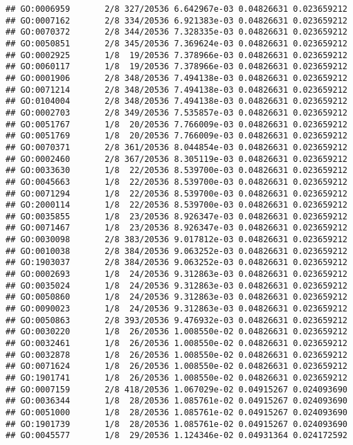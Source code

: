 \documentclass[
]{article}
\begin{document}
\begin{verbatim}
## GO:0006959       2/8 327/20536 6.642967e-03 0.04826631 0.023659212
## GO:0007162       2/8 334/20536 6.921383e-03 0.04826631 0.023659212
## GO:0070372       2/8 344/20536 7.328335e-03 0.04826631 0.023659212
## GO:0050851       2/8 345/20536 7.369624e-03 0.04826631 0.023659212
## GO:0002925       1/8  19/20536 7.378966e-03 0.04826631 0.023659212
## GO:0060117       1/8  19/20536 7.378966e-03 0.04826631 0.023659212
## GO:0001906       2/8 348/20536 7.494138e-03 0.04826631 0.023659212
## GO:0071214       2/8 348/20536 7.494138e-03 0.04826631 0.023659212
## GO:0104004       2/8 348/20536 7.494138e-03 0.04826631 0.023659212
## GO:0002703       2/8 349/20536 7.535857e-03 0.04826631 0.023659212
## GO:0051767       1/8  20/20536 7.766009e-03 0.04826631 0.023659212
## GO:0051769       1/8  20/20536 7.766009e-03 0.04826631 0.023659212
## GO:0070371       2/8 361/20536 8.044854e-03 0.04826631 0.023659212
## GO:0002460       2/8 367/20536 8.305119e-03 0.04826631 0.023659212
## GO:0033630       1/8  22/20536 8.539700e-03 0.04826631 0.023659212
## GO:0045663       1/8  22/20536 8.539700e-03 0.04826631 0.023659212
## GO:0071294       1/8  22/20536 8.539700e-03 0.04826631 0.023659212
## GO:2000114       1/8  22/20536 8.539700e-03 0.04826631 0.023659212
## GO:0035855       1/8  23/20536 8.926347e-03 0.04826631 0.023659212
## GO:0071467       1/8  23/20536 8.926347e-03 0.04826631 0.023659212
## GO:0030098       2/8 383/20536 9.017812e-03 0.04826631 0.023659212
## GO:0010038       2/8 384/20536 9.063252e-03 0.04826631 0.023659212
## GO:1903037       2/8 384/20536 9.063252e-03 0.04826631 0.023659212
## GO:0002693       1/8  24/20536 9.312863e-03 0.04826631 0.023659212
## GO:0035024       1/8  24/20536 9.312863e-03 0.04826631 0.023659212
## GO:0050860       1/8  24/20536 9.312863e-03 0.04826631 0.023659212
## GO:0090023       1/8  24/20536 9.312863e-03 0.04826631 0.023659212
## GO:0050863       2/8 393/20536 9.476932e-03 0.04826631 0.023659212
## GO:0030220       1/8  26/20536 1.008550e-02 0.04826631 0.023659212
## GO:0032461       1/8  26/20536 1.008550e-02 0.04826631 0.023659212
## GO:0032878       1/8  26/20536 1.008550e-02 0.04826631 0.023659212
## GO:0071624       1/8  26/20536 1.008550e-02 0.04826631 0.023659212
## GO:1901741       1/8  26/20536 1.008550e-02 0.04826631 0.023659212
## GO:0007159       2/8 418/20536 1.067029e-02 0.04915267 0.024093690
## GO:0036344       1/8  28/20536 1.085761e-02 0.04915267 0.024093690
## GO:0051000       1/8  28/20536 1.085761e-02 0.04915267 0.024093690
## GO:1901739       1/8  28/20536 1.085761e-02 0.04915267 0.024093690
## GO:0045577       1/8  29/20536 1.124346e-02 0.04931364 0.024172592

\end{verbatim}
\end{document}
